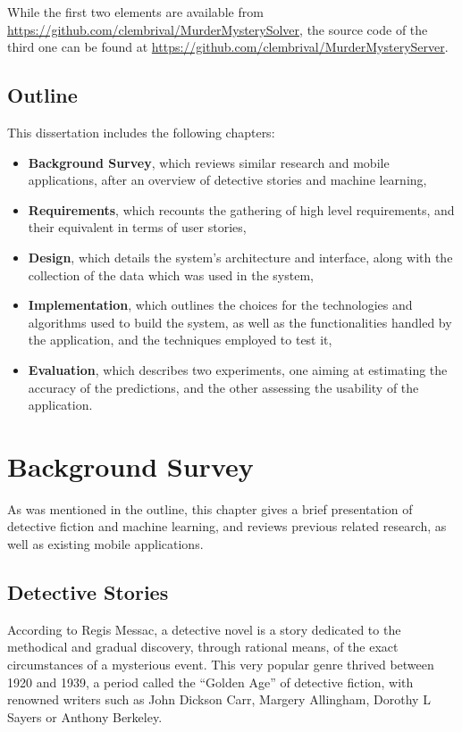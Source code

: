 \documentclass{mproj}
\begin{document}
While the first two elements are available from \url{https://github.com/clembrival/MurderMysterySolver}, the source code of the third one can be found at \url{https://github.com/clembrival/MurderMysteryServer}.

\section{Outline}

This dissertation includes the following chapters: 
\begin{itemize}
	\item \textbf{Background Survey}, which reviews similar research and mobile applications, after an overview of detective stories and machine learning,
	\item \textbf{Requirements}, which recounts the gathering of high level requirements, and their equivalent in terms of user stories,
	\item \textbf{Design}, which details the system's architecture and interface, along with the collection of the data which was used in the system,
	\item \textbf{Implementation}, which outlines the choices for the technologies and algorithms used to build the system, as well as the functionalities handled by the application, and the techniques employed to test it,
	\item \textbf{Evaluation}, which describes two experiments, one aiming at estimating the accuracy of the predictions, and the other assessing the usability of the application.
\end{itemize}

\chapter{Background Survey}\label{survey}

As was mentioned in the outline, this chapter gives a brief presentation of detective fiction and machine learning, and reviews previous related research, as well as existing mobile applications.

\section{Detective Stories}

According to Regis Messac, a detective novel is a story dedicated to the methodical and gradual discovery, through rational means, of the exact circumstances of a mysterious event. \cite{detectivenovel} This very popular genre thrived between 1920 and 1939, a period called the ``Golden Age'' of detective fiction, with renowned writers such as John Dickson Carr, Margery Allingham, Dorothy L Sayers or Anthony Berkeley. \cite{detectiveauthors}
\end{document}
